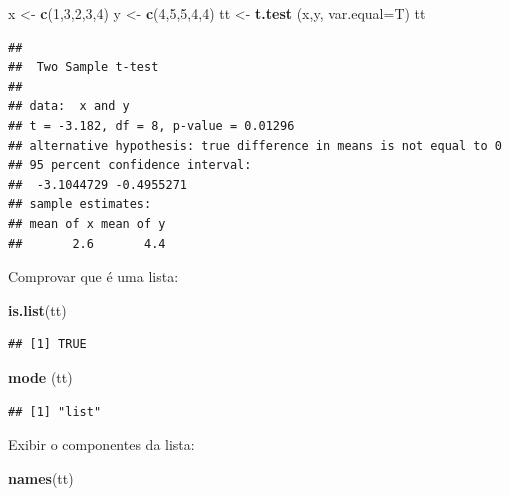 \documentclass[
]{book}
\newenvironment{Shaded}{\begin{snugshade}}{\end{snugshade}}
\newcommand{\DataTypeTok}[1]{\textcolor[rgb]{0.13,0.29,0.53}{#1}}
\newcommand{\DecValTok}[1]{\textcolor[rgb]{0.00,0.00,0.81}{#1}}
\newcommand{\KeywordTok}[1]{\textcolor[rgb]{0.13,0.29,0.53}{\textbf{#1}}}
\newcommand{\NormalTok}[1]{#1}
\newcommand{\StringTok}[1]{\textcolor[rgb]{0.31,0.60,0.02}{#1}}
\begin{document}
\begin{Shaded}
\begin{Highlighting}[]
\NormalTok{x <-}\StringTok{ }\KeywordTok{c}\NormalTok{(}\DecValTok{1}\NormalTok{,}\DecValTok{3}\NormalTok{,}\DecValTok{2}\NormalTok{,}\DecValTok{3}\NormalTok{,}\DecValTok{4}\NormalTok{)}
\NormalTok{y <-}\StringTok{ }\KeywordTok{c}\NormalTok{(}\DecValTok{4}\NormalTok{,}\DecValTok{5}\NormalTok{,}\DecValTok{5}\NormalTok{,}\DecValTok{4}\NormalTok{,}\DecValTok{4}\NormalTok{)}
\NormalTok{tt <-}\StringTok{ }\KeywordTok{t.test}\NormalTok{ (x,y, }\DataTypeTok{var.equal=}\NormalTok{T)}
\NormalTok{tt}
\end{Highlighting}
\end{Shaded}

\begin{verbatim}
## 
##  Two Sample t-test
## 
## data:  x and y
## t = -3.182, df = 8, p-value = 0.01296
## alternative hypothesis: true difference in means is not equal to 0
## 95 percent confidence interval:
##  -3.1044729 -0.4955271
## sample estimates:
## mean of x mean of y 
##       2.6       4.4
\end{verbatim}

Comprovar que é uma lista:

\begin{Shaded}
\begin{Highlighting}[]
\KeywordTok{is.list}\NormalTok{(tt)}
\end{Highlighting}
\end{Shaded}

\begin{verbatim}
## [1] TRUE
\end{verbatim}

\begin{Shaded}
\begin{Highlighting}[]
\KeywordTok{mode}\NormalTok{ (tt)}
\end{Highlighting}
\end{Shaded}

\begin{verbatim}
## [1] "list"
\end{verbatim}

Exibir o componentes da lista:

\begin{Shaded}
\begin{Highlighting}[]
\KeywordTok{names}\NormalTok{(tt)}
\end{Highlighting}
\end{Shaded}
\end{document}

